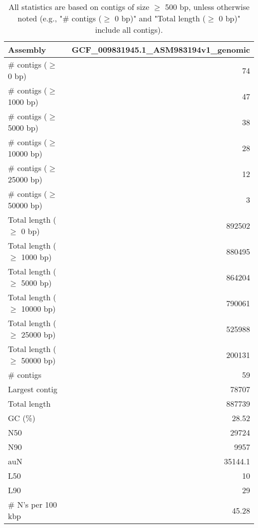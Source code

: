 \documentclass[12pt,a4paper]{article}
\begin{document}
\begin{table}[ht]
\begin{center}
\caption{All statistics are based on contigs of size $\geq$ 500 bp, unless otherwise noted (e.g., "\# contigs ($\geq$ 0 bp)" and "Total length ($\geq$ 0 bp)" include all contigs).}
\begin{tabular}{|l*{1}{|r}|}
\hline
Assembly & GCF\_009831945.1\_ASM983194v1\_genomic \\ \hline
\# contigs ($\geq$ 0 bp) & 74 \\ \hline
\# contigs ($\geq$ 1000 bp) & 47 \\ \hline
\# contigs ($\geq$ 5000 bp) & 38 \\ \hline
\# contigs ($\geq$ 10000 bp) & 28 \\ \hline
\# contigs ($\geq$ 25000 bp) & 12 \\ \hline
\# contigs ($\geq$ 50000 bp) & 3 \\ \hline
Total length ($\geq$ 0 bp) & 892502 \\ \hline
Total length ($\geq$ 1000 bp) & 880495 \\ \hline
Total length ($\geq$ 5000 bp) & 864204 \\ \hline
Total length ($\geq$ 10000 bp) & 790061 \\ \hline
Total length ($\geq$ 25000 bp) & 525988 \\ \hline
Total length ($\geq$ 50000 bp) & 200131 \\ \hline
\# contigs & 59 \\ \hline
Largest contig & 78707 \\ \hline
Total length & 887739 \\ \hline
GC (\%) & 28.52 \\ \hline
N50 & 29724 \\ \hline
N90 & 9957 \\ \hline
auN & 35144.1 \\ \hline
L50 & 10 \\ \hline
L90 & 29 \\ \hline
\# N's per 100 kbp & 45.28 \\ \hline
\end{tabular}
\end{center}
\end{table}
\end{document}
